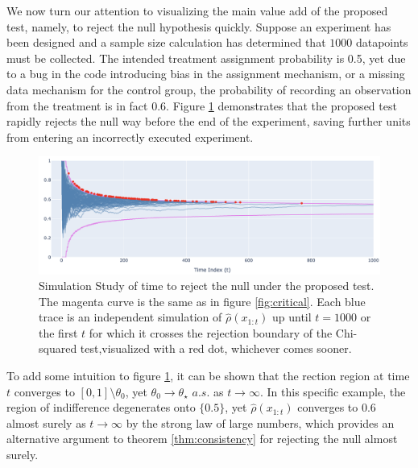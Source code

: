 \documentclass[11pt]{article}
\begin{document}
  We now turn our attention to visualizing the main value add of the proposed test, namely, to reject the null hypothesis quickly. Suppose an experiment has been designed and a sample size calculation has determined that $1000$ datapoints must be collected. The intended treatment assignment probability is 0.5, yet due to a bug in the code introducing bias in the assignment mechanism, or a missing data mechanism for the control group, the probability of recording an observation from the treatment is in fact 0.6.
  Figure \ref{fig:ssrm_reject} demonstrates that the proposed test rapidly rejects the null way before the end of the experiment, saving further units from entering an incorrectly executed experiment.
      \begin{figure}[H]
  \centering
  \includegraphics[scale=0.5]{images/ssrm_reject.png}
  \caption{Simulation Study of time to reject the null under the proposed test. The magenta curve is the same as in figure \ref{fig:critical}. Each blue trace is an independent simulation of $\hat{\rho}(x_{1:t})$ up until $t=1000$ or the first $t$ for which it crosses the rejection boundary of the Chi-squared test,visualized with a red dot, whichever comes sooner. }
    \label{fig:ssrm_reject}
  \end{figure}
  \noindent To add some intuition to figure \ref{fig:ssrm_reject}, it can be shown that the rection region at time $t$ converges to $[0,1]\setminus \theta_0$, yet $\theta_0 \rightarrow \theta_\star$ $a.s.$ as $t\rightarrow \infty$. In this specific example, the region of indifference degenerates onto $\lbrace 0.5 \rbrace$, yet $\hat{\rho}(x_{1:t})$ converges to 0.6 almost surely as $t \rightarrow \infty$ by the strong law of large numbers, which provides an alternative argument to theorem \ref{thm:consistency} for rejecting the null almost surely.
\end{document}
